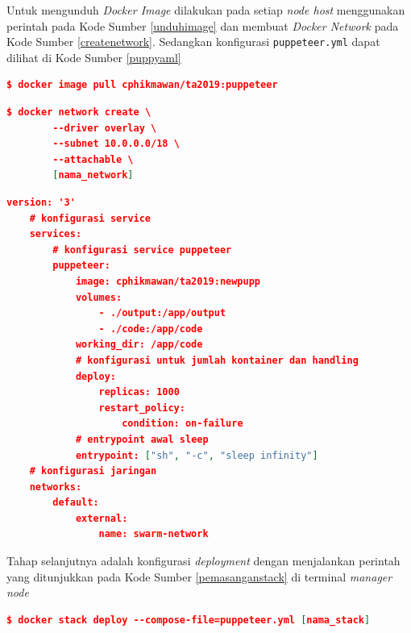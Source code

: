 			\indent Untuk mengunduh \textit{Docker Image} dilakukan pada setiap \textit{node host} menggunakan perintah pada Kode Sumber \ref{unduhimage} dan membuat \textit{Docker Network} pada Kode Sumber \ref{createnetwork}. Sedangkan konfigurasi \texttt{puppeteer.yml} dapat dilihat di Kode Sumber \ref{puppyaml}
			\begin{lstlisting}[frame=single,tabsize=2,breaklines,caption={Perintah untuk mengunduh \textit{Docker Image} },label=unduhimage, captionpos=b, language=json,numbers=none]
	$ docker image pull cphikmawan/ta2019:puppeteer
			\end{lstlisting}
			
			\begin{lstlisting}[frame=single,tabsize=2,breaklines,caption={Perintah untuk membuat\textit{ Docker Network} },label=createnetwork, captionpos=b, language=json,numbers=none]
	$ docker network create \
		--driver overlay \
		--subnet 10.0.0.0/18 \
		--attachable \
		[nama_network]
			\end{lstlisting}
			
			\begin{lstlisting}[frame=single,tabsize=2,breaklines,caption={Konfigurasi \textit{puppeteer.yml}},label=puppyaml, captionpos=b, language=json]
	version: '3'
	# konfigurasi service
	services:
		# konfigurasi service puppeteer
		puppeteer:
			image: cphikmawan/ta2019:newpupp
			volumes:
				- ./output:/app/output
				- ./code:/app/code
			working_dir: /app/code
			# konfigurasi untuk jumlah kontainer dan handling
			deploy:
				replicas: 1000
				restart_policy:
					condition: on-failure
			# entrypoint awal sleep
			entrypoint: ["sh", "-c", "sleep infinity"]
	# konfigurasi jaringan
	networks:
		default:
			external:
				name: swarm-network
			\end{lstlisting}
			
			\indent Tahap selanjutnya adalah konfigurasi \textit{deployment} dengan menjalankan perintah yang ditunjukkan pada Kode Sumber \ref{pemasanganstack} di terminal \textit{manager node}
			\begin{lstlisting}[frame=single,tabsize=2,breaklines,caption={Perintah untuk pemasangan kontainer },label=pemasanganstack, captionpos=b, language=json,numbers=none]
	$ docker stack deploy --compose-file=puppeteer.yml [nama_stack]
			\end{lstlisting}
	

